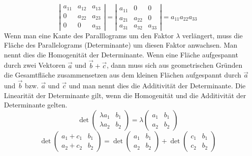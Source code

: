 \begin{equation}
\boxed{\left\vert\begin{matrix}a_{11}&a_{12}&a_{13}\\0&a_{22}&a_{23}\\0&0&a_{33}\end{matrix}\right\vert=\left\vert\begin{matrix}a_{11}&0&0\\a_{21}&a_{22}&0\\a_{31}&a_{32}&a_{33}\end{matrix}\right\vert=a_{11}a_{22}a_{33}}
\end{equation}
Wenn man eine Kante des Paralllograms um den Faktor $\lambda$ verlängert, muss die Fläche des Parallelograms (Determinante) um diesen Faktor anwachsen. Man nennt dies die Homogenität der Determinante.
\newline\newline
Wenn eine Fläche aufgespannt durch zwei Vektoren $\overrightarrow{a}$ und $\overrightarrow{b}+\overrightarrow{c}$, dann muss sich aus geometrischen Gründen die Gesamtfläche zusammensetzen aus dem kleinen Flächen aufgespannt durch $\overrightarrow{a}$ und $\overrightarrow{b}$ bzw. $\overrightarrow{a}$ und $\overrightarrow{c}$ und man nennt dies die Additivität der Determinante.
\newline\newline
Die Linearität der Determinante gilt, wenn die Homogenität und die Additivität der Determinante gelten.
\begin{equation}
\boxed{\det\begin{pmatrix}\lambda a_1&b_1\\\lambda a_2&b_2\end{pmatrix}=\lambda\begin{pmatrix}a_1&b_1\\a_2&b_2\end{pmatrix}}
\end{equation}
\begin{equation}
\boxed{\det\begin{pmatrix}a_1+c_1&b_1\\a_2+c_2&b_2\end{pmatrix}=\det\begin{pmatrix}a_1&b_1\\a_2&b_2\end{pmatrix}+\det\begin{pmatrix}c_1&b_1\\c_2&b_2\end{pmatrix}}
\end{equation}
